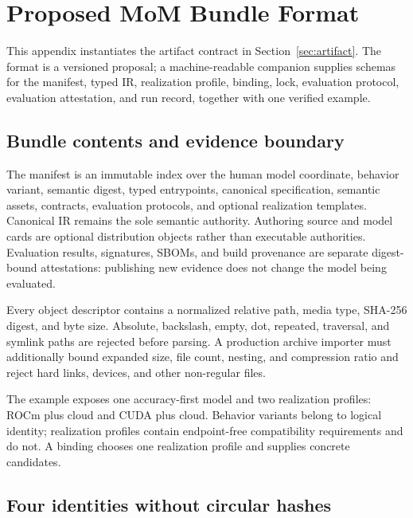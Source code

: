 \section{Proposed MoM Bundle Format}
\label{app:artifact-profile}
\begingroup
\footnotesize

This appendix instantiates the artifact contract in
Section~\ref{sec:artifact}. The format is a versioned proposal; a
machine-readable companion supplies schemas for the manifest, typed IR,
realization profile, binding, lock, evaluation protocol, evaluation
attestation, and run record, together with one verified example.

\subsection{Bundle contents and evidence boundary}

The manifest is an immutable index over the human model coordinate, behavior
variant, semantic digest, typed entrypoints, canonical specification, semantic
assets, contracts, evaluation protocols, and optional realization templates.
Canonical IR remains the sole semantic authority. Authoring source and model
cards are optional distribution objects rather than executable authorities.
Evaluation results, signatures, SBOMs, and build provenance are separate
digest-bound attestations: publishing new evidence does not change the model
being evaluated.

Every object descriptor contains a normalized relative path, media type,
SHA-256 digest, and byte size. Absolute, backslash, empty, dot, repeated,
traversal, and symlink paths are rejected before parsing. A production archive
importer must additionally bound expanded size, file count, nesting, and
compression ratio and reject hard links, devices, and other non-regular files.

The example exposes one accuracy-first model and two realization profiles:
ROCm plus cloud and CUDA plus cloud. Behavior variants belong to logical
identity; realization profiles contain endpoint-free compatibility
requirements and do not. A binding chooses one realization profile and supplies
concrete candidates.

\subsection{Four identities without circular hashes}

